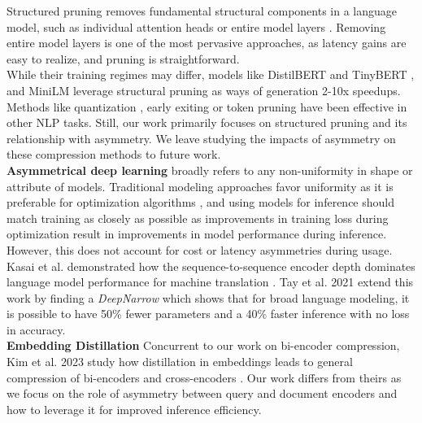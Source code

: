 Structured pruning removes fundamental structural components in a language model, such as individual attention heads \cite{Voita2019AnalyzingMS} or entire model layers \cite{sanh2019distilbert}. Removing entire model layers is one of the most pervasive approaches, as latency gains are easy to realize, and pruning is straightforward. \\
While their training regimes may differ, models like DistilBERT \cite{sanh2019distilbert} and TinyBERT \cite{Jiao2020TinyBERTDB}, and MiniLM \cite{wang2020minilm} leverage structural pruning as ways of generation 2-10x speedups. \\
Methods like quantization \cite{Pouransari2020LeastSB} \cite{Zafrir2019Q8BERTQ8}, early exiting \cite{Xin2020DeeBERTDE} or token pruning \cite{Kim2021LearnedTP} have been effective in other NLP tasks. Still, our work primarily focuses on structured pruning and its relationship with asymmetry. We leave studying the impacts of asymmetry on these compression methods to future work.  \\
\textbf{Asymmetrical deep learning} broadly refers to any non-uniformity in shape or attribute of models. Traditional modeling approaches favor uniformity as it is preferable for optimization algorithms \cite{Mihaylova2019ScheduledSF}, and using models for inference should match training as closely as possible \cite{Ranzato2015SequenceLT} as improvements in training loss during optimization result in improvements in model performance during inference. However, this does not account for cost or latency asymmetries during usage. Kasai et al. demonstrated how the sequence-to-sequence encoder depth dominates language model performance for machine translation \cite{Kasai2020DeepES}. Tay et al. 2021 extend this work by finding a \textit{DeepNarrow} which shows that for broad language modeling, it is possible to have 50\% fewer parameters and a 40\% faster inference with no loss in accuracy.\\
\textbf{Embedding Distillation}
Concurrent to our work on bi-encoder compression, Kim et al. 2023 study how distillation in embeddings leads to general compression of bi-encoders and cross-encoders \cite{Kim2023EmbedDistillAG}. Our work differs from theirs as we focus on the role of asymmetry between query and document encoders and how to leverage it for improved inference efficiency.


